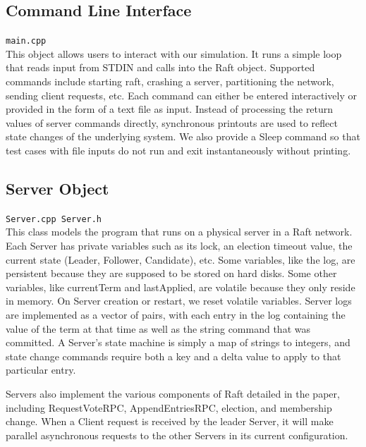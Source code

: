 \documentclass[letterpaper,twocolumn,10pt]{article}
\begin{document}
\subsection{Command Line Interface}
\texttt{main.cpp} \\
This object allows users to interact with our simulation. It runs a simple loop that reads input from STDIN and calls into the Raft object. Supported commands include starting raft, crashing a server, partitioning the network, sending client requests, etc. Each command can either be entered interactively or provided in the form of a text file as input. Instead of processing the return values of server commands directly, synchronous printouts are used to reflect state changes of the underlying system. We also provide a Sleep command so that test cases with file inputs do not run and exit instantaneously without printing. 

\subsection{Server Object}
\texttt{Server.cpp Server.h} \\
This class models the program that runs on a physical server in a Raft network. Each Server has private variables such as its lock, an election timeout value, the current state (Leader, Follower, Candidate), etc. Some variables, like the log, are persistent because they are supposed to be stored on hard disks. Some other variables, like currentTerm and lastApplied, are volatile because they only reside in memory. On Server creation or restart, we reset volatile variables. Server logs are implemented as a vector of pairs, with each entry in the log containing the value of the term at that time as well as the string command that was committed. A Server's state machine is simply a map of strings to integers, and state change commands require both a key and a delta value to apply to that particular entry. 

Servers also implement the various components of Raft detailed in the paper, including RequestVoteRPC, AppendEntriesRPC, election, and membership change. When a Client request is received by the leader Server, it will make parallel asynchronous requests to the other Servers in its current configuration. 

\end{document}
